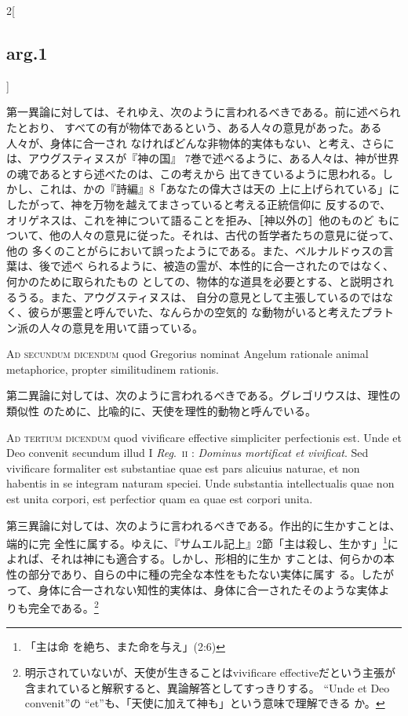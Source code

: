 \documentclass[paper=a4paper,fontsize=10pt,jafontsize=9pt,titlepage]{jlreq}
\begin{document}
\begin{paracol}{2}[\subsection{arg.1}]
\switchcolumn

第一異論に対しては、それゆえ、次のように言われるべきである。前に述べられたとおり、
すべての有が物体であるという、ある人々の意見があった。ある人々が、身体に合一され
なければどんな非物体的実体もない、と考え、さらには、アウグスティヌスが『神の国』
7巻で述べるように、ある人々は、神が世界の魂であるとすら述べたのは、この考えから
出てきているように思われる。しかし、これは、かの『詩編』8「あなたの偉大さは天の
上に上げられている」にしたがって、神を万物を越えてまさっていると考える正統信仰に
反するので、オリゲネスは、これを神について語ることを拒み、［神以外の］他のものど
もについて、他の人々の意見に従った。それは、古代の哲学者たちの意見に従って、他の
多くのことがらにおいて誤ったようにである。また、ベルナルドゥスの言葉は、後で述べ
られるように、被造の霊が、本性的に合一されたのではなく、何かのために取られたもの
としての、物体的な道具を必要とする、と説明されるうる。また、アウグスティヌスは、
自分の意見として主張しているのではなく、彼らが悪霊と呼んでいた、なんらかの空気的
な動物がいると考えたプラトン派の人々の意見を用いて語っている。

\switchcolumn*[\subsection{ad.2}]

{\scshape Ad secundum dicendum} quod Gregorius nominat
Angelum rationale animal metaphorice, propter similitudinem rationis.

\switchcolumn

第二異論に対しては、次のように言われるべきである。グレゴリウスは、理性の類似性
のために、比喩的に、天使を理性的動物と呼んでいる。

\switchcolumn*[\subsection{ad.3}]

{\scshape Ad tertium dicendum} quod vivificare effective simpliciter
perfectionis est. Unde et Deo convenit secundum illud I {\itshape
Reg}.~{\scshape ii} : {\itshape Dominus mortificat et vivificat}. Sed
vivificare formaliter est substantiae quae est pars alicuius naturae, et
non habentis in se integram naturam speciei. Unde substantia
intellectualis quae non est unita corpori, est perfectior quam ea quae
est corpori unita.

\switchcolumn

第三異論に対しては、次のように言われるべきである。作出的に生かすことは、端的に完
全性に属する。ゆえに、『サムエル記上』2節「主は殺し、生かす」\footnote{「主は命
を絶ち、また命を与え」(2:6)}によれば、それは神にも適合する。しかし、形相的に生か
すことは、何らかの本性の部分であり、自らの中に種の完全な本性をもたない実体に属す
る。したがって、身体に合一されない知性的実体は、身体に合一されたそのような実体よ
りも完全である。\footnote{明示されていないが、天使が生きることはvivificare
effectiveだという主張が含まれていると解釈すると、異論解答としてすっきりする。
``Unde et Deo convenit''の ``et''も、「天使に加えて神も」という意味で理解できる
か。}

\end{paracol}
\end{document}

